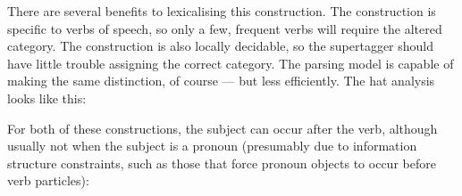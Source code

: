 \begin{center}
\end{center}

There are several benefits to lexicalising this construction. The construction
is specific to verbs of speech, so only a few, frequent verbs will require the
altered category. The construction is also locally decidable, so the
supertagger should have little trouble assigning the correct category. The
parsing model is capable of making the same distinction, of course --- but less
efficiently. The hat analysis looks like this:
 

For both of these constructions, the subject can occur after the verb, although
usually not when the subject is a pronoun (presumably due to information
structure constraints, such as those that force pronoun objects to occur before
verb particles):

